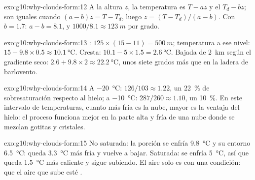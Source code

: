 \begin{solution}{exo:g10:why-clouds-form:12}
A la altura $z$, la temperatura es $T - a z$ y el  $T_d - b z$;
son iguales cuando $(a - b) z = T - T_d$, luego $z = (T - T_d)/(a - b)$. Con
$b = 1.7$: $a - b = 8.1$, y $1000/8.1 \approx \qty{123}{m}$ por grado.
\end{solution}

\begin{solution}{exo:g10:why-clouds-form:13}
: $125 \times (15 - 11) = \qty{500}{m}$; temperatura a
ese nivel: $15 - 9.8 \times 0.5 \approx \qty{10.1}{\degreeCelsius}$. Cresta:
$10.1 - 5
\times 1.5 = \qty{2.6}{\degreeCelsius}$. Bajada de \qty{2}{km}
según el gradiente seco: $2.6 + 9.8 \times 2 \approx \qty{22.2}{\degreeCelsius}$,
unos siete grados más que en la ladera de barlovento.
\end{solution}

\begin{solution}{exo:g10:why-clouds-form:14}
A \qty{-20}{\degreeCelsius}: $126/103 \approx 1.22$, un \qty{22}{\percent}
de sobresaturación respecto al hielo; a \qty{-10}{\degreeCelsius}:
$287/260 \approx
1.10$, un \qty{10}{\percent}. En este intervalo de
temperaturas, cuanto más fría es la nube, mayor es la ventaja del hielo: el
proceso funciona mejor en la parte alta y fría de una nube donde se mezclan
gotitas y cristales.
\end{solution}

\begin{solution}{exo:g10:why-clouds-form:15}
No saturada: la porción se enfría \qty{9.8}{\degreeCelsius} y su entorno
\qty{6.5}{\degreeCelsius}: queda \qty{3.3}{\degreeCelsius} más fría y vuelve
a bajar. Saturada: se enfría \qty{5}{\degreeCelsius}, así que queda
\qty{1.5}{\degreeCelsius} más caliente y sigue subiendo. El aire solo es
 con una condición: que el aire que sube esté .
\end{solution}

